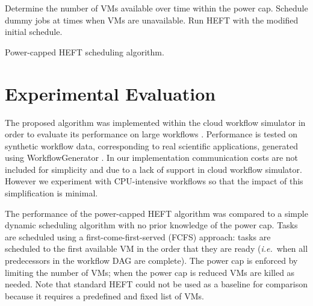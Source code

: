 \documentclass[10pt, conference, compsocconf]{IEEEtran} %
\newcommand{\ie}{\textit{i.e.}\ }
\begin{document}
\begin{algorithm}
  \begin{algorithmic}[1]
    \State Determine the number of VMs available over time within the power cap.
    \State Schedule dummy jobs at times when VMs are unavailable.
    \State Run HEFT with the modified initial schedule.


  \end{algorithmic}
  \caption{Power-capped HEFT scheduling algorithm.}
  \label{alg:power-capped-heft}
\end{algorithm}

\section{Experimental Evaluation}

The proposed algorithm was implemented within the cloud workflow simulator in order to evaluate its performance on large workflows \cite{CloudWorkflowSimulator,malawski2012cost}.
Performance is tested on synthetic workflow data, corresponding to real scientific applications, generated using WorkflowGenerator \cite{WorkflowGenerator,Silva2014WorkflowGenerator}.
In our implementation communication costs are not included for simplicity and due to a lack of support in cloud workflow simulator.
However we experiment with CPU-intensive workflows \cite{Bharathi2008} so that the impact of this simplification is minimal.

The performance of the power-capped HEFT algorithm was compared to a simple dynamic scheduling algorithm with no prior knowledge of the power cap.
Tasks are scheduled using a first-come-first-served (FCFS) approach: tasks are scheduled to the first available VM in the order that they are ready (\ie when all predecessors in the workflow DAG are complete).
The power cap is enforced by limiting the number of VMs; when the power cap is reduced VMs are killed as needed.
Note that standard HEFT could not be used as a baseline for comparison because it requires a predefined and fixed list of VMs.
\end{document}
